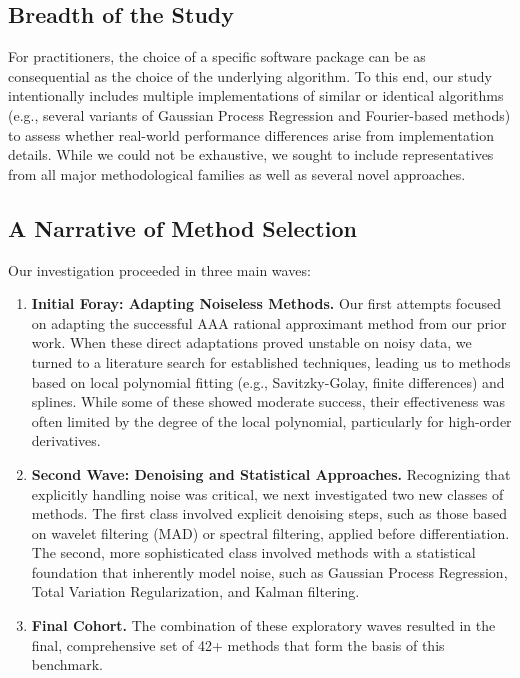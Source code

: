 \subsection{Breadth of the Study}
\label{sec:breadth}

For practitioners, the choice of a specific software package can be as consequential as the choice of the underlying algorithm. To this end, our study intentionally includes multiple implementations of similar or identical algorithms (e.g., several variants of Gaussian Process Regression and Fourier-based methods) to assess whether real-world performance differences arise from implementation details. While we could not be exhaustive, we sought to include representatives from all major methodological families as well as several novel approaches.

\subsection{A Narrative of Method Selection}
\label{sec:method_selection}

Our investigation proceeded in three main waves:

\begin{enumerate}
    \item \textbf{Initial Foray: Adapting Noiseless Methods.} Our first attempts focused on adapting the successful AAA rational approximant method from our prior work. When these direct adaptations proved unstable on noisy data, we turned to a literature search for established techniques, leading us to methods based on local polynomial fitting (e.g., Savitzky-Golay, finite differences) and splines. While some of these showed moderate success, their effectiveness was often limited by the degree of the local polynomial, particularly for high-order derivatives.
    \item \textbf{Second Wave: Denoising and Statistical Approaches.} Recognizing that explicitly handling noise was critical, we next investigated two new classes of methods. The first class involved explicit denoising steps, such as those based on wavelet filtering (MAD) or spectral filtering, applied before differentiation. The second, more sophisticated class involved methods with a statistical foundation that inherently model noise, such as Gaussian Process Regression, Total Variation Regularization, and Kalman filtering.
    \item \textbf{Final Cohort.} The combination of these exploratory waves resulted in the final, comprehensive set of 42+ methods that form the basis of this benchmark.
\end{enumerate}

